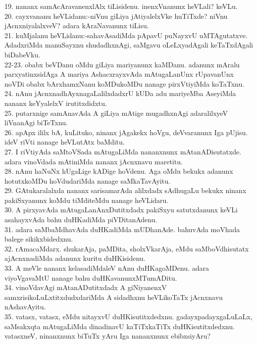 \documentclass{article}
\begin{document}
19. nananx samAcAravanenxlAlx tiLisidenu. inenxVnanunx heVLali? keVLu.\\
20. cayxvananu heVLidanu:-niVnu giLiya jAtiyalelxVke huTiTxde? niVnu jAcnxniyalalxveV? adara kAraNavanunx tiLisu.\\
21. kuMjalanu heVLidanu:-sahavAsadiMda pApavU puNayxvU uMTAgutatxve. AdadxriMda manuSayxnu shudadhxnAgi, saMgavu oLeLxyadAgali keTaTxdAgali biDabeVku.\\
22-23. obabx beVDanu oMdu giLiya mariyanunx kaMDanu. adanunx mAralu parxyatinxsidAga A mariya AshacxrayxvAda mAtugaLanUnx rUpavanUnx noVDi obabx bArxhamxNanu koMDukoMDu nanage pirxVtiyiMda koTaTxnu.\\
24. nAnu jAcnxnadhAyxnagaLalilxdadxrU kUDa adu mariyeMba AseyiMda nananx keYyalelxV irutitxdidxtu.\\
25. putarxnige samAnavAda A giLiya mAtige mugadhxnAgi adaralilxyeV liVnanAgi biTeTxnu.\\
26. apApx ililx bA, kuLituko, ninanx jAgakekx hoVgu, deVvaranunx Iga pUjisu. ideV riVti nanage heVLutAtx baMditu.\\
27. I riVtiyAda saMtoVSada mAtugaLiMda nananxnunx mAtanADisutatxde. adara vinoVdada mAtiniMda nananx jAcnxnavu maretitu.\\
28. nAnu haNuNx hUgaLige kADige hoVdenu. Aga oMdu bekukx adanunx hotutxkoMDu hoVdudariMda nanage saMkaTavAyitu.\\
29. GAtukaralalxda nananx sarisamarAda alilxdadx sAdhugaLu bekukx ninanx pakiSxyanunx koMdu tiMditeMdu nanage heVLidaru.\\
30. A pirxyavAda mAtugaLanAnxDutitxdadx pakiSxyu satutxdanunx keVLi asahayxvAda bahu duHKadiMda piVDitanAdenu.\\
31. adara saMbaMdhavAda duHKadiMda mUDhanAde. bahuvAda moVhada balege sikikxbidedxnu.\\
32. rAmacaMdarx. shukarAja, paMDita, sholxVkarAja, eMdu saMboVdhisutatx ajAcnxnadiMda adanunx kuritu duHKisidenu.\\
33. A meVle nananx kelasadiMdaleV nAnu duHKagoMDenu. adara viyoVgavaMtU nanage bahu duHKavanunxMTumADitu.\\
34. vinoVdavAgi mAtanADutitxdadx A giNiyanenxV samxrisikoLuLxtitxdudxdariMda A sidadhxnu heVLikoTaTx jAcnxnavu nAshavAyitu.\\
35. vatasx, vatasx, eMdu nitayxvU duHKisutitxdedxnu. gadayxpadayxgaLuLaLx, saMsakxqta mAtugaLiMda dinadinavU kaTiTxkaTiTx duHKisutitxdedxnu. vatasxneV, ninanxnunx biTuTx yAru Iga nananxnunx ebibxsiyAru?\\
\end{document}
